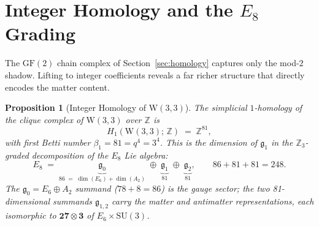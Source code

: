 \documentclass[12pt,a4paper]{article}
\newtheorem{proposition}[theorem]{Proposition}
\newcommand{\W}{\mathrm{W}(3,3)}
\begin{document}

\section{Integer Homology and the $E_8$ Grading}
\label{sec:integer-homology}

The $\mathrm{GF}(2)$ chain complex of Section~\ref{sec:homology} captures
only the mod-$2$ shadow.  Lifting to integer coefficients reveals a
far richer structure that directly encodes the matter content.

\begin{proposition}[Integer Homology of $\W$]\label{prop:integer-homology}
The simplicial $1$-homology of the clique complex of\/ $\W$ over $\mathbb{Z}$
is
\[
  H_1(\W;\,\mathbb{Z}) \;=\; \mathbb{Z}^{81},
\]
with first Betti number $\beta_1 = 81 = q^4 = 3^4$.
This is the dimension of $\mathfrak{g}_1$ in the $\mathbb{Z}_3$-graded
decomposition of the $E_8$ Lie algebra:
\[
  E_8 \;=\; \underbrace{\mathfrak{g}_0}_{86\;=\;\dim(E_6) + \dim(A_2)}
  \;\oplus\; \underbrace{\mathfrak{g}_1}_{81}
  \;\oplus\; \underbrace{\mathfrak{g}_2}_{81},
  \qquad 86 + 81 + 81 = 248.
\]
The $\mathfrak{g}_0 = E_6 \oplus A_2$ summand ($78 + 8 = 86$) is the
gauge sector; the two 81-dimensional summands $\mathfrak{g}_{1,2}$
carry the matter and antimatter representations, each isomorphic to
$\mathbf{27} \otimes \mathbf{3}$ of $E_6 \times \mathrm{SU}(3)$.
\end{proposition}
\end{document}
